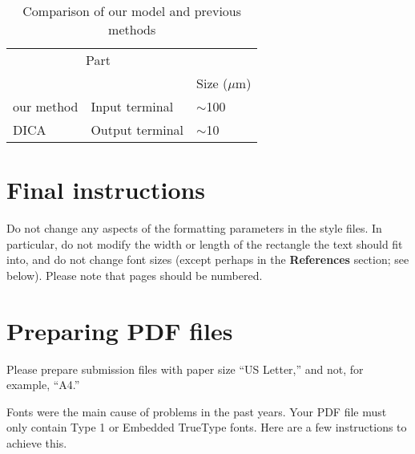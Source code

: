 \documentclass{article}
\begin{document}
\begin{table}[t]
  \caption{Comparison of our model and previous methods}
  \label{sample-table}
  \centering
  \begin{tabular}{lll}
    \toprule
    \multicolumn{2}{c}{Part}                   \\
    \cmidrule{1-2}
         &     & Size ($\mu$m) \\
    \midrule
    our method & Input terminal  & $\sim$100     \\
    DICA     & Output terminal & $\sim$10      \\
    \bottomrule
  \end{tabular}
\end{table}

\section{Final instructions}

Do not change any aspects of the formatting parameters in the style
files.  In particular, do not modify the width or length of the
rectangle the text should fit into, and do not change font sizes
(except perhaps in the \textbf{References} section; see below). Please
note that pages should be numbered.

\section{Preparing PDF files}

Please prepare submission files with paper size ``US Letter,'' and
not, for example, ``A4.''

Fonts were the main cause of problems in the past years. Your PDF file
must only contain Type 1 or Embedded TrueType fonts. Here are a few
instructions to achieve this.
\end{document}
